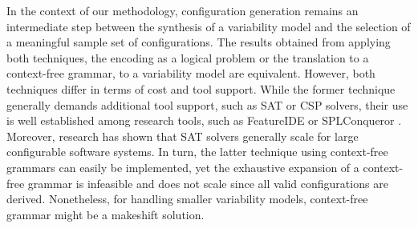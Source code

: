 In the context of our methodology, configuration generation remains an
intermediate step between the synthesis of a variability model and the
selection of a meaningful sample set of configurations. The results obtained
from applying both techniques, the encoding as a logical problem or the
translation to a context-free grammar,  to a variability model are equivalent.
However, both techniques differ in terms of cost and tool support. While the
former technique generally demands additional tool support, such as SAT or CSP
solvers, their use is well established among research tools, such as FeatureIDE
\cite{al-hajjaji_incling:_2016} or SPLConqueror \cite{siegmund_predicting_2012}. Moreover, research
has shown that SAT solvers generally scale for large configurable software systems. In turn, the latter technique using
context-free grammars can easily be implemented, yet the exhaustive expansion
of a context-free grammar is infeasible and does not scale since all valid
configurations are derived. Nonetheless, for handling smaller variability
models, context-free grammar might be a makeshift solution.
 

